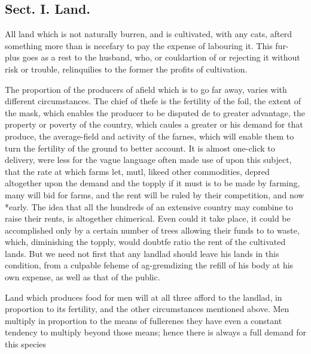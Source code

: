 \subsection*{Sect. I. Land.}
All land which is not naturally burren, and is cultivated, with any cats, afterd something more than is necefary to pay the expense of labouring it. This fur- plus goes as a rest to the husband, who, or couldartion of or rejecting it without risk or trouble, relinquilies to the former the profits of cultivation.\par\medskip
The proportion of the producers of afield which is to go far away, varies with different circumstances. The chief of thefe is the fertility of the foil, the extent of the mask, which enables the producer to be disputed de to greater advantage, the property or poverty of the country, which caules a greater or his demand for that produce, the average-field and activity of the farnes, which will enable them to turn the fertility of the ground to better account. It is almost one-click to delivery, were less for the vague language often made use of upon this subject, that the rate at which farms let, mutl, likeed other commodities, depred altogether upon the demand and the topply if it must is to be made by farming, many will bid for farms, and the rent will be ruled by their competition, and now *early. The idea that all the hundreds of an extensive country may combine to raise their rents, is altogether chimerical. Even could it take place, it could be accomplished only by a certain number of trees allowing their funds to to waste, which, diminishing the topply, would doubtfe ratio the rent of the cultivated lands. But we need not first that any landlad should leave his lands in this condition, from a culpable feheme of ag-gremdizing the refill of his body at his own expense, as well as that of the public.\par\medskip
Land which produces food for men will at all three afford to the landlad, in proportion to its fertility, and the other circumstances mentioned above. Men multiply in proportion to the means of fullerenes they have even a constant tendency to multiply beyond those means; hence there is always a full demand for this species\par\medskip
